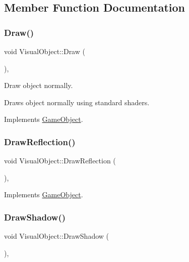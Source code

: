 \subsection{Member Function Documentation}
\mbox{\label{class_visual_object_a10c0e01e375fd4af08e57f3475dd312c}} 
\subsubsection{\texorpdfstring{Draw()}{Draw()}}
{\footnotesize\ttfamily void Visual\+Object\+::\+Draw (\begin{DoxyParamCaption}{ }\end{DoxyParamCaption})\hspace{0.3cm}{\ttfamily [override]}, {\ttfamily [virtual]}}



Draw object normally. 

Draws object normally using standard shaders. 

Implements \mbox{\hyperlink{class_game_object_a29a665f46fda87982825bc5c0ca6a888}{Game\+Object}}.

\mbox{\label{class_visual_object_afaf21bc843280f7f8ebf52ab7d71ac2d}} 
\subsubsection{\texorpdfstring{DrawReflection()}{DrawReflection()}}
{\footnotesize\ttfamily void Visual\+Object\+::\+Draw\+Reflection (\begin{DoxyParamCaption}{ }\end{DoxyParamCaption})\hspace{0.3cm}{\ttfamily [override]}, {\ttfamily [virtual]}}



Implements \mbox{\hyperlink{class_game_object_ad28240509bb63e4fde243e842898cf30}{Game\+Object}}.

\mbox{\label{class_visual_object_a88e778dc97ad93cefd5193d6899d6c82}} 
\subsubsection{\texorpdfstring{DrawShadow()}{DrawShadow()}}
{\footnotesize\ttfamily void Visual\+Object\+::\+Draw\+Shadow (\begin{DoxyParamCaption}{ }\end{DoxyParamCaption})\hspace{0.3cm}{\ttfamily [override]}, {\ttfamily [virtual]}}



